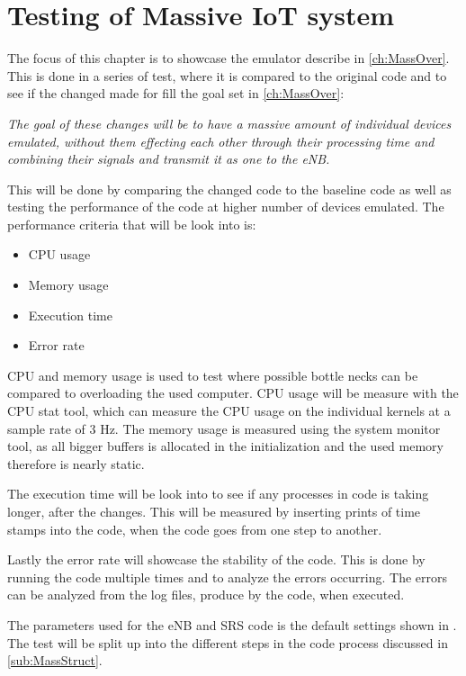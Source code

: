 \chapter{Testing of Massive IoT system}
The focus of this chapter is to showcase the emulator describe in \autoref{ch:MassOver}. This is done in a series of test, where it is compared to the original code and to see if the changed made for fill the goal set in \autoref{ch:MassOver}:

\textit{The goal of these changes will be to have a massive amount of individual devices emulated, without them effecting each other through their processing time and combining their signals and transmit it as one to the eNB.}

This will be done by comparing the changed code to the baseline code as well as testing the performance of the code at higher number of devices emulated.
The performance criteria that will be look into is:

\begin{itemize}
\item CPU usage
\item Memory usage
\item Execution time
\item Error rate
\end{itemize}

CPU and memory usage is used to test where possible bottle necks can be compared to overloading the used computer. CPU usage will be measure with the CPU stat tool, which can measure the CPU usage on the individual kernels at a sample rate of 3 Hz. The memory usage is measured using the system monitor tool, as all bigger buffers is allocated in the initialization and the used memory therefore is nearly static. 

The execution time will be look into to see if any processes in code is taking longer, after the changes. This will be measured by inserting prints of time stamps into the code, when the code goes from one step to another. 

Lastly the error rate will showcase the stability of the code. This is done by running the code multiple times and to analyze the errors occurring. The errors can be analyzed from the log files, produce by the code, when executed.

The parameters used for the eNB and SRS code is the default settings shown in . The test will be split up into the different steps in the code process discussed in \autoref{sub:MassStruct}.

